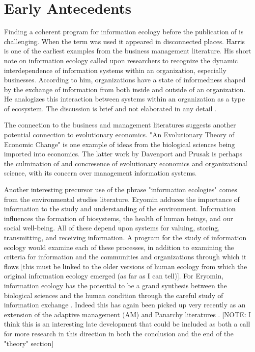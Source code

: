 \section{Early Antecedents}

Finding a coherent program for information ecology before the publication of \cite{nardi_information_1999, davenport_information_1997} is challenging. When the term was used it appeared in disconnected places. Harris is one of the earliest examples from the business management literature. His short note on information ecology called upon researchers to recognize the dynamic interdependence of information systems within an organization, especially businesses. According to him, organizations have a state of informedness shaped by the exchange of information from both inside and outside of an organization. He analogizes this interaction between systems within an organization as a type of ecosystem. The discussion is brief and not elaborated in any detail \cite{harris_information_1989}.

The connection to the business and management literatures suggests another potential connection to evolutionary economics. "An Evolutionary Theory of Economic Change" \cite{nelson_evolutionary_1985} is one example of ideas from the biological sciences being imported into economics. The latter work by Davenport and Prusak is perhaps the culmination of and concresence of evolutionary economics and organizational science, with its concern over management information systems.

Another interesting precursor use of the phrase "information ecologies" comes from the environmental studies literature. Eryomin adduces the importance of information to the study and understanding of the environment. Information influences the formation of biosystems, the health of human beings, and our social well-being. All of these depend upon systems for valuing, storing, transmitting, and receiving information. A program for the study of information ecology would examine each of these processes, in addition to examining the criteria for information and the communities and organizations through which it flows [this must be linked to the older versions of human ecology from which the original information ecology emerged (as far as I can tell)]. For Eryomin, information ecology has the potential to be a grand synthesis between the biological sciences and the human condition through the careful study of information exchange \cite{eryomin_information_1998}. Indeed this has again been picked up very recently as an extension of the adaptive management (AM) and Panarchy literatures \cite{eddy_information_2014}. [NOTE: I think this is an interesting late development that could be included as both a call for more research in this direction in both the conclusion and the end of the "theory" section]

